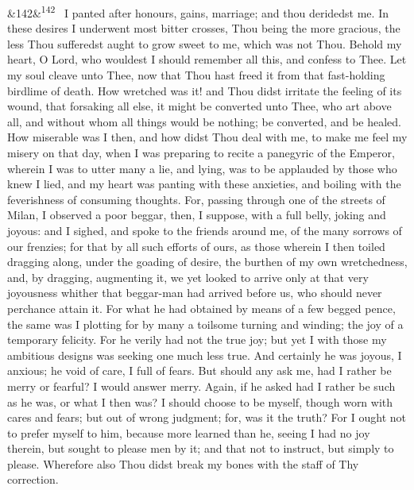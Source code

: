 \documentclass[12pt]{article}
\newcommand{\para}[1][]{\par\noindent\ifx&#1&\else\textsuperscript{\footnotesize #1}~\fi}
\begin{document}
\para[142] I panted after honours, gains, marriage; and thou deridedst me. In these desires I underwent most bitter crosses, Thou being the more gracious, the less Thou sufferedst aught to grow sweet to me, which was not Thou. Behold my heart, O Lord, who wouldest I should remember all this, and confess to Thee. Let my soul cleave unto Thee, now that Thou hast freed it from that fast-holding birdlime of death. How wretched was it! and Thou didst irritate the feeling of its wound, that forsaking all else, it might be converted unto Thee, who art above all, and without whom all things would be nothing; be converted, and be healed. How miserable was I then, and how didst Thou deal with me, to make me feel my misery on that day, when I was preparing to recite a panegyric of the Emperor, wherein I was to utter many a lie, and lying, was to be applauded by those who knew I lied, and my heart was panting with these anxieties, and boiling with the feverishness of consuming thoughts. For, passing through one of the streets of Milan, I observed a poor beggar, then, I suppose, with a full belly, joking and joyous: and I sighed, and spoke to the friends around me, of the many sorrows of our frenzies; for that by all such efforts of ours, as those wherein I then toiled dragging along, under the goading of desire, the burthen of my own wretchedness, and, by dragging, augmenting it, we yet looked to arrive only at that very joyousness whither that beggar-man had arrived before us, who should never perchance attain it. For what he had obtained by means of a few begged pence, the same was I plotting for by many a toilsome turning and winding; the joy of a temporary felicity. For he verily had not the true joy; but yet I with those my ambitious designs was seeking one much less true. And certainly he was joyous, I anxious; he void of care, I full of fears. But should any ask me, had I rather be merry or fearful? I would answer merry. Again, if he asked had I rather be such as he was, or what I then was? I should choose to be myself, though worn with cares and fears; but out of wrong judgment; for, was it the truth? For I ought not to prefer myself to him, because more learned than he, seeing I had no joy therein, but sought to please men by it; and that not to instruct, but simply to please. Wherefore also Thou didst break my bones with the staff of Thy correction.
\end{document}
